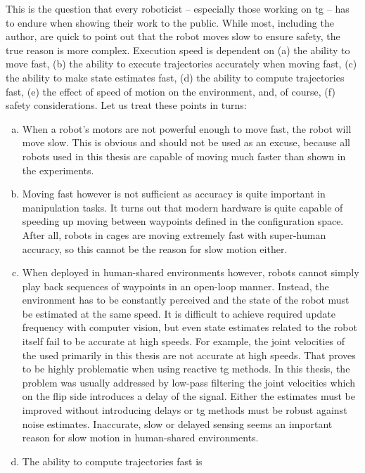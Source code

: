 This is the question that every roboticist
-- especially those working on \ac{tg} --
has to endure when showing their work to the public. While most, including the
author, are quick to point out that the robot moves slow to ensure safety, the
true reason is more complex. Execution speed is dependent on
(a) the ability to move fast,
(b) the ability to execute trajectories accurately when moving fast,
(c) the ability to make state estimates fast,
(d) the ability to compute trajectories fast,
(e) the effect of speed of motion on the environment,
and, of course,  (f) safety considerations.
Let us treat these
points in turns:
\begin{enumerate}[(a)]
  \item When a robot's motors are not powerful enough to
    move fast, the robot will move slow. This is obvious and
    should not be used as an excuse, because all robots used
    in this thesis are capable of moving much faster than
    shown in the experiments. 
  \item Moving fast however is not sufficient as accuracy
    is quite important in manipulation tasks. It turns out
    that modern hardware is quite capable of speeding up
    moving between waypoints defined in the configuration
    space. After all,
    robots in cages are moving extremely fast with
    super-human accuracy, so this cannot be the reason for
    slow motion either.
  \item When deployed in human-shared environments however,
    robots cannot simply play back sequences of waypoints in
    an open-loop manner. Instead, the environment has to be
    constantly perceived and the state of the robot must be
    estimated at the same speed. It is difficult
    to achieve required update frequency with computer
    vision, but even state estimates related to the robot
    itself fail to be accurate at high speeds. For example,
    the joint velocities of the \panda{} used primarily
    in this thesis are not accurate at high speeds. That
    proves to be highly problematic when using reactive
    \ac{tg} methods. In this thesis, the problem was usually
    addressed by low-pass filtering the joint velocities
    which on the flip side introduces a delay of the signal.
    Either the estimates must be improved without
    introducing delays or \ac{tg} methods must be robust
    against noise estimates. Inaccurate, slow or delayed
    sensing seems an important reason for slow motion in
    human-shared environments.
  \item The ability to compute trajectories fast is

\end{enumerate}
